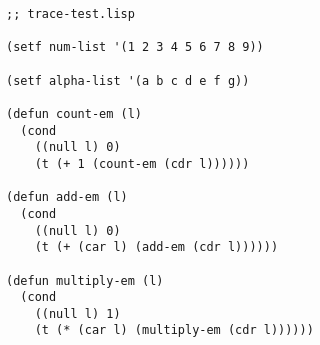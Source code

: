 \documentclass{article}
\begin{document}
%
%
%
%

\lstset{language=Lisp,numbers=left,keepspaces=false,basicstyle=\small,numberstyle=\tiny,breaklines=true,showstringspaces=false}
\begin{lstlisting}
;; trace-test.lisp

(setf num-list '(1 2 3 4 5 6 7 8 9))

(setf alpha-list '(a b c d e f g))

(defun count-em (l)
  (cond
    ((null l) 0)
    (t (+ 1 (count-em (cdr l))))))

(defun add-em (l)
  (cond
    ((null l) 0)
    (t (+ (car l) (add-em (cdr l))))))

(defun multiply-em (l)
  (cond
    ((null l) 1)
    (t (* (car l) (multiply-em (cdr l))))))
\end{lstlisting}
\end{document}
